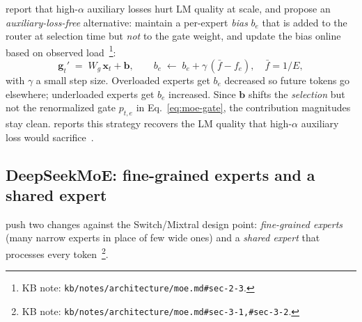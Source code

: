 \citet[\S 2]{deepseek-v3} report that high-$\alpha$ auxiliary losses
hurt LM quality at scale, and propose an
\emph{auxiliary-loss-free} alternative: maintain a per-expert
\emph{bias} $b_e$ that is added to the router  at selection
time but \emph{not} to the gate weight, and update the bias online
based on observed
load~\citep{deepseek-v3}\footnote{KB note:
\texttt{kb/notes/architecture/moe.md\#sec-2-3}. }:
\begin{equation}
  \mathbf{g}_t' \;=\; W_g\,\mathbf{x}_t + \mathbf{b},
  \qquad
  b_e \;\leftarrow\; b_e + \gamma\,(\bar{f} - f_e),
  \quad \bar{f} = 1/E,
  \label{eq:moe-aux-free}
\end{equation}
with $\gamma$ a small step size. Overloaded experts get $b_e$
decreased so future tokens go elsewhere; underloaded experts get
$b_e$ increased. Since $\mathbf{b}$ shifts the \emph{selection}
 but not the renormalized gate $p_{t,e}$ in
Eq.~\eqref{eq:moe-gate}, the contribution magnitudes stay
clean.  reports this strategy recovers the LM quality
that high-$\alpha$ auxiliary loss would
sacrifice~\citep[abstract]{deepseek-v3}.

\subsection{DeepSeekMoE: fine-grained experts and a shared expert}
\label{sec:ffn-fine-grained}

\citet{deepseekmoe2024} push two changes against the
Switch/Mixtral design point: \emph{fine-grained experts} (many narrow
experts in place of few wide ones) and a \emph{shared expert} that
processes every
token~\citep{deepseekmoe2024}\footnote{KB note:
\texttt{kb/notes/architecture/moe.md\#sec-3-1,\#sec-3-2}. }.

